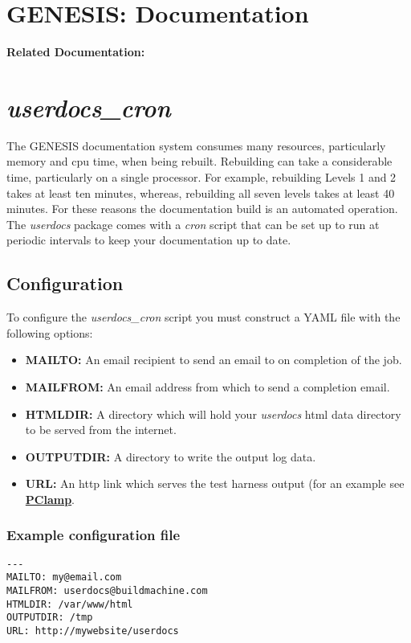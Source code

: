 \documentclass[12pt]{article}
\begin{document}
\section*{GENESIS: Documentation}

{\bf Related Documentation:}

\section*{\it userdocs\_cron}

The GENESIS documentation system consumes many resources, particularly memory and cpu time, when being rebuilt. Rebuilding can take a considerable time, particularly on a single processor. For example, rebuilding Levels 1 and 2 takes at least ten minutes, whereas, rebuilding all seven levels takes at least 40 minutes. For these reasons the documentation build is an automated operation. The {\it userdocs} package comes with a {\it cron} script that can be set up to run at periodic intervals to keep your documentation up to date.

\subsection*{Configuration}

To configure the {\it userdocs\_cron} script you must construct a YAML file with the following options:
\begin{itemize}
   \item {\bf MAILTO:} An email recipient to send an email to on completion of the job.
   \item {\bf MAILFROM:} An email address from which to send a completion email.
   \item {\bf HTMLDIR:} A directory which will hold your {\it userdocs} html data directory to be served from the internet.
   \item {\bf OUTPUTDIR:} A directory to write the output log data.
   \item {\bf URL:} An http link which serves the test harness output (for an example see \href{http://neurospaces.sourceforge.net/neurospaces_project/gshell/tests/html/specifications/pclamp.html}{\bf PClamp}. 
\end{itemize}
\subsubsection*{Example configuration file}

\begin{verbatim}
---
MAILTO: my@email.com
MAILFROM: userdocs@buildmachine.com
HTMLDIR: /var/www/html
OUTPUTDIR: /tmp
URL: http://mywebsite/userdocs
\end{verbatim}
\end{document}
